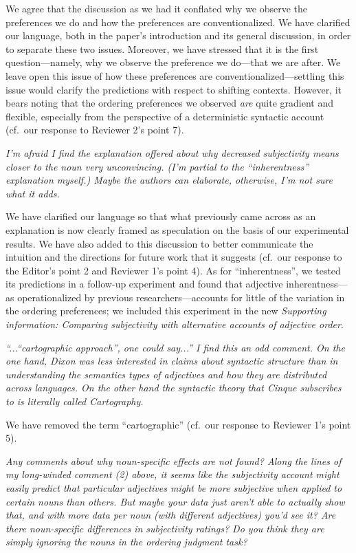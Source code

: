 \documentclass[12pt]{article}
\begin{document}
We agree that the discussion as we had it conflated why we observe the preferences we do and how the preferences are conventionalized. We have clarified our language, both in the paper's introduction and its general discussion, in order to separate these two issues. Moreover, we have stressed that it is the first question---namely, why we observe the preference we do---that we are after. We leave open this issue of how these preferences are conventionalized---settling this issue would clarify the predictions with respect to shifting contexts. However, it bears noting that the ordering preferences we observed \emph{are} quite gradient and flexible, especially from the perspective of a deterministic syntactic account (cf.~our response to Reviewer 2's point 7).

\item \emph{I'm afraid I find the explanation offered about why decreased subjectivity means closer to the noun very unconvincing. (I'm partial to the ``inherentness'' explanation myself.) Maybe the authors can elaborate, otherwise, I'm not sure what it adds.}

We have clarified our language so that what previously came across as an explanation is now clearly framed as speculation on the basis of our experimental results. We have also added to this discussion to better communicate the intuition and the directions for future work that it suggests (cf.~our response to the Editor's point 2 and Reviewer 1's point 4). As for ``inherentness'', we tested its predictions in a follow-up experiment and found that adjective inherentness---as operationalized by previous researchers---accounts for little of the variation in the ordering preferences; we included this experiment in the new \emph{Supporting information: Comparing subjectivity with alternative accounts of adjective order}.

\item \emph{``...``cartographic approach'', one could say...'' I find this an odd comment. On the one hand, Dixon was less interested in claims about syntactic structure than in understanding the semantics types of adjectives and how they are distributed across languages. On the other hand the syntactic theory that Cinque subscribes to is literally called Cartography.}

We have removed the term ``cartographic'' (cf.~our response to Reviewer 1's point 5).

\item \emph{Any comments about why noun-specific effects are not found? Along the lines of my long-winded comment (2) above, it seems like the subjectivity account might easily predict that particular adjectives might be more subjective when applied to certain nouns than others. But maybe your data just aren't able to actually show that, and with more data per noun (with different adjectives) you'd see it? Are there noun-specific differences in subjectivity ratings? Do you think they are simply ignoring the nouns in the ordering judgment task?}
\end{document}
